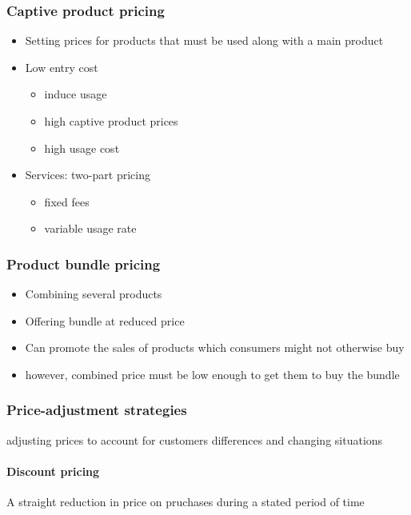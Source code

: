 \documentclass[a4paper,titlepage] {scrartcl}
\begin{document}
\subsubsection{Captive product pricing}
\begin{itemize}
	\item Setting prices for products that must be used along with a main product
	\item Low entry cost
	\begin{itemize}
		\item induce usage
		\item high captive product prices
		\item high usage cost
	\end{itemize}
	\item Services: two-part pricing
	\begin{itemize}
		\item fixed fees
		\item variable usage rate
	\end{itemize}
\end{itemize}

\subsubsection{Product bundle pricing}
\begin{itemize}
	\item Combining several products
	\item Offering bundle at reduced price
	\item Can promote the sales of products which consumers might not otherwise buy
	\item however, combined price must be low enough to get them to buy the bundle
\end{itemize}

\subsubsection{Price-adjustment strategies}
adjusting prices to account for customers differences and changing situations

\paragraph{Discount pricing} %
\label{par:discount_pricing}
A straight reduction in price on pruchases during a stated period of time
\end{document}
